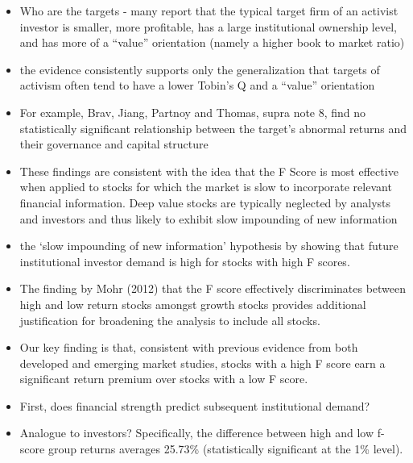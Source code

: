 \documentclass[12pt]{article}
\begin{document}
    \begin{itemize}

        \item Who are the targets - many report that the typical target firm of an activist investor is smaller, more profitable, has a large institutional ownership level, and has more of a “value” orientation (namely a higher book to market ratio) \citep{CoffeeJr.2014}

        \item the evidence consistently supports only the generalization that targets of activism often tend to have a lower Tobin’s Q and a “value” orientation \citep{CoffeeJr.2014}

        \item For example, Brav, Jiang, Partnoy and Thomas, supra note 8, find no statistically significant relationship between the target’s abnormal returns and their governance and capital structure \citep{CoffeeJr.2014}

        \item These findings are consistent with the idea that the F Score is most effective when applied to stocks for which the market is slow to incorporate relevant financial information. Deep value stocks are typically neglected by analysts and investors and thus likely to exhibit slow impounding of new information \citep{Hyde2014}

        \item the ‘slow impounding of new information’ hypothesis by showing that future institutional investor demand is high for stocks with high F scores. \citep{Hyde2014}

        \item The finding by Mohr (2012) that the F score effectively discriminates between high and low return stocks amongst growth stocks provides additional justification for broadening the analysis to include all stocks. \citep{Hyde2014}

        \item Our key finding is that, consistent with previous evidence from both developed and emerging market studies, stocks with a high F score earn a significant return premium over stocks with a low F score.\citep{Hyde2014}

        \item First, does financial strength predict subsequent institutional demand? \citep{Choi2012}

        \item Analogue to investors? Specifically, the difference between high and low f-score group returns averages 25.73\% (statistically significant at the 1\% level). \citep{Choi2012}


\end{itemize}
\end{document}
